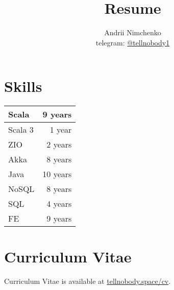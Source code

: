 

\title{Resume}
\author{
  Andrii Nimchenko\\
  telegram: \href{https://t.me/tellnobody1}{@tellnobody1}
}
\date{}
\maketitle

\section*{Skills}
\begin{table}[H]
  \begin{tabular}{lr}
  Scala    &  9 years \\ \hline
  Scala 3  &  1 year  \\ \hline
  ZIO      &  2 years \\ \hline
  Akka     &  8 years \\ \hline
  Java     & 10 years \\ \hline
  NoSQL    &  8 years \\ \hline
  SQL      &  4 years \\ \hline
  FE       &  9 years \\
  \end{tabular}
\end{table}

\section*{Curriculum Vitae}
Curriculum Vitae is available at \href{https://tellnobody.space/cv/}{tellnobody.space/cv}.

